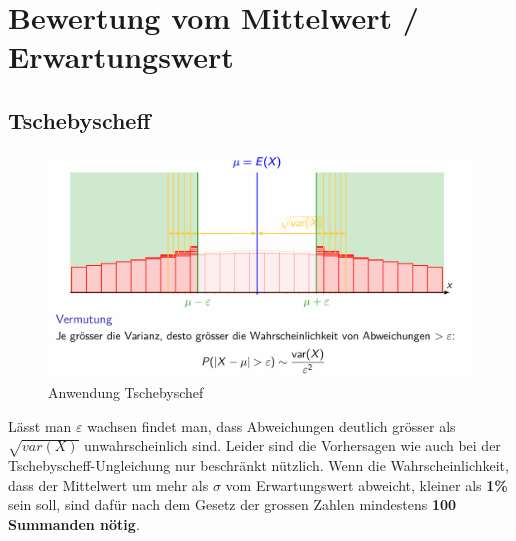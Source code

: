 \documentclass[../Main.tex]{subfiles}
\begin{document}
\section{Bewertung vom Mittelwert / Erwartungswert}

\subsection{Tschebyscheff}
\begin{figure}[H]
    \centering
    \includegraphics[width=1\linewidth]{Images/tschebyschef.png}
    \caption{Anwendung Tschebyschef}
\end{figure}

Lässt man \(\varepsilon\) wachsen findet man,
dass Abweichungen deutlich grösser als \(\sqrt{var(X)}\) unwahrscheinlich sind.  
Leider sind die Vorhersagen wie auch bei der
Tschebyscheff-Ungleichung nur beschränkt nützlich.
Wenn die Wahrscheinlichkeit, dass der Mittelwert um mehr
als \(\sigma\) vom Erwartungswert abweicht, kleiner als
\textbf{1\% } sein soll, sind dafür nach dem Gesetz der grossen Zahlen
mindestens \textbf{100 Summanden nötig}. 
\end{document}
